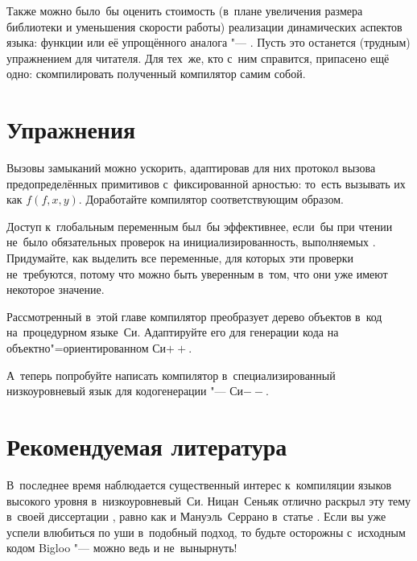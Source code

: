 Также можно было~бы оценить стоимость (в~плане увеличения размера библиотеки и
уменьшения скорости работы) реализации динамических аспектов языка: функции
 или её упрощённого аналога "--- . Пусть это останется
(трудным) упражнением для читателя. Для тех~же, кто с~ним справится, припасено
ещё одно: скомпилировать полученный компилятор самим собой.


\section{Упражнения}\label{cc/sect:exercises}

\begin{exercise}\label{cc/ex:boost-calls}
Вызовы замыканий можно ускорить, адаптировав для них протокол вызова
предопределённых примитивов с~фиксированной арностью: то~есть вызывать их как
$f(f, x, y)$. Доработайте компилятор соответствующим образом.
\end{exercise}

\begin{exercise}\label{cc/ex:global-check}
Доступ к~глобальным переменным был~бы эффективнее, если~бы при чтении не~было
обязательных проверок на инициализированность, выполняемых
. Придумайте, как выделить все переменные, для которых
эти проверки не~требуются, потому что можно быть уверенным в~том, что они уже
имеют некоторое значение.
\end{exercise}

\begin{project}
Рассмотренный в~этой главе компилятор преобразует дерево объектов в~код
на~процедурном языке~Си. Адаптируйте его для генерации кода на
объектно"=ориентированном Си$++$.
\end{project}

\begin{project}
А~теперь попробуйте написать компилятор в~специализированный низкоуровневый
язык для кодогенерации "--- Си$--$.
\end{project}


\section*{Рекомендуемая литература}\label{cc/sect:recommended-reading}

В~последнее время наблюдается существенный интерес к~компиляции языков высокого
уровня в~низкоуровневый~Си. Ницан~Сеньяк отлично раскрыл эту тему в~своей
диссертации \cite{sen91}, равно как и Мануэль~Серрано в~статье \cite{ser93}.
Если вы уже успели влюбиться по уши в~подобный подход, то будьте осторожны
с~исходным кодом Bigloo \cite{ser94} "--- можно ведь и не~вынырнуть!

